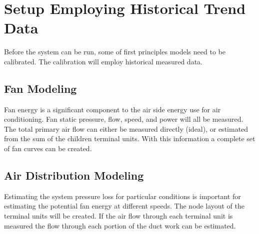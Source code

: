 \section{Setup Employing Historical Trend Data}

Before the system can be run, some of first principles models need to be calibrated. The calibration will employ historical measured data.

\subsection{Fan Modeling}

Fan energy is a significant component to the air side energy use for air conditioning. Fan static pressure, flow, speed, and power will all be measured. The total primary air flow can either be measured directly (ideal), or estimated from the sum of the children terminal units. With this information a complete set of fan curves can be created. 

\subsection{Air Distribution Modeling}

Estimating the system pressure loss for particular conditions is important for estimating the potential fan energy at different speeds. The node layout of the terminal units will be created. If the air flow through each terminal unit is measured the flow through each portion of the duct work can be estimated. 


\begin{sidewaysfigure}
\end{sidewaysfigure}



























